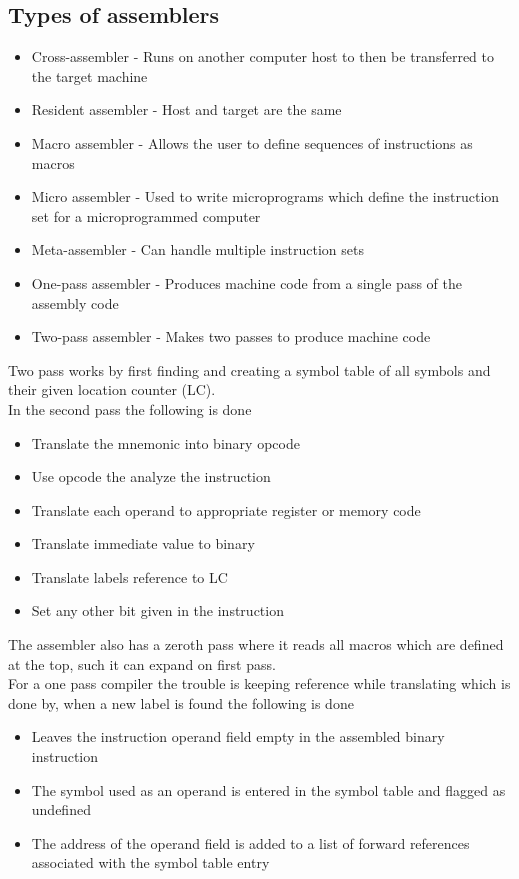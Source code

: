 \documentclass[12pt, a4paper]{article}
\begin{document}
		\subsection{Types of assemblers}
			\begin{itemize}
				\item Cross-assembler - Runs on another computer host to then be transferred to the target machine
				\item Resident assembler - Host and target are the same
				\item Macro assembler - Allows the user to define sequences of instructions as macros
				\item Micro assembler - Used to write microprograms which define the instruction set for a microprogrammed computer
				\item Meta-assembler - Can handle multiple instruction sets
				\item One-pass assembler - Produces machine code from a single pass of the assembly code
				\item Two-pass assembler - Makes two passes to produce machine code
			\end{itemize}
			Two pass works by first finding and creating a symbol table of all symbols and their given location counter (LC).\\
			In the second pass the following is done
			\begin{itemize}
				\item Translate the mnemonic into binary opcode
				\item Use opcode the analyze the instruction
				\item Translate each operand to appropriate register or memory code
				\item Translate immediate value to binary
				\item Translate labels reference to LC 
				\item Set any other bit given in the instruction
			\end{itemize}
			The assembler also has a zeroth pass where it reads all macros which are defined at the top, such it can expand on first pass.\\[4mm]
			For a one pass compiler the trouble is keeping reference while translating which is done by, when a new label is found the following is done
			\begin{itemize}
				\item Leaves the instruction operand field empty in the assembled binary instruction
				\item The symbol used as an operand is entered in the symbol table and flagged as undefined
				\item The address of the operand field is added to a list of forward references associated with the symbol table entry
			\end{itemize}
\end{document}

